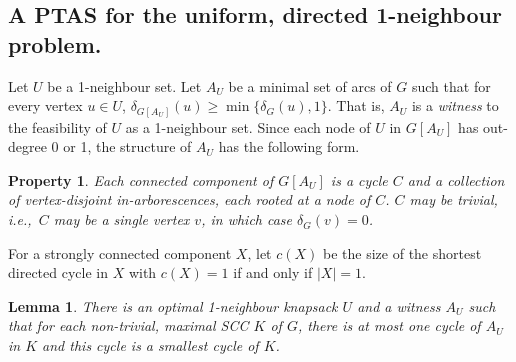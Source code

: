 \documentclass[12pt]{article}
\newtheorem{lemma}[theorem]{Lemma}
\newtheorem{property}[theorem]{Property}
\begin{document}
\subsection{A PTAS for the uniform, directed 1-neighbour problem.}
Let $U$ be a 1-neighbour set.  Let $A_U$ be a minimal set of arcs of
$G$ such that for every vertex $u \in U$, $\delta_{G[A_U]}(u) \geq \min \{\delta_G(u),1\}$.  That is, $A_U$ is a
{\em witness} to the feasibility of $U$ as a 1-neighbour set.  Since
each node of $U$ in $G[A_U]$ has out-degree 0 or 1, the structure of
$A_U$ has the following form.

\begin{property}
\label{prop:structure}
Each connected component of $G[A_U]$ is a cycle $C$ and a collection
of vertex-disjoint in-arborescences, each rooted at a node of $C$.  $C$
may be trivial, i.e.,~$C$ may be a single vertex $v$, in which case
$\delta_G(v) = 0$.
\end{property}

For a strongly connected component $X$, let $c(X)$ be the size of the
shortest directed cycle in $X$ with $c(X) = 1$ if and only if $|X| = 1$.

\begin{lemma}
\label{lem:scc-structure}
There is an optimal 1-neighbour knapsack $U$ and a witness $A_U$ such that
for each non-trivial, maximal SCC $K$ of $G$, there is at most one
cycle of $A_U$ in $K$ and this cycle is a smallest cycle of $K$.
\end{lemma}
\end{document}
